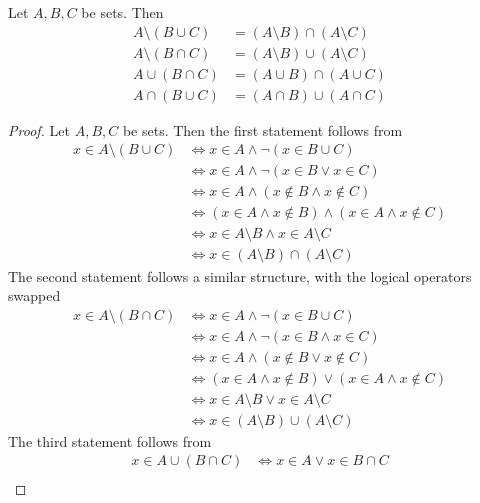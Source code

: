\documentclass[../../script.tex]{subfiles}
\begin{document}
\begin{thm}
	Let $A, B, C$ be sets. Then
	\begin{align*}
		A \setminus (B \cup C) &= (A \setminus B) \cap (A \setminus C) \\
		A \setminus (B \cap C) &= (A \setminus B) \cup (A \setminus C) \\
		A \cup (B \cap C) &= (A \cup B) \cap (A \cup C) \\
		A \cap (B \cup C) &= (A \cap B) \cup (A \cap C)
	\end{align*}
\end{thm}
\begin{proof}
	Let $A, B, C$ be sets. Then the first statement follows from
	\begin{equation}
		\begin{split}
			x \in A \setminus (B \cup C) &\iff x \in A \wedge \neg(x \in B \cup C) \\
			&\iff x \in A \wedge \neg(x \in B \vee x \in C) \\
			&\iff x \in A \wedge (x \not\in B \wedge x \not\in C) \\
			&\iff (x \in A \wedge x \not\in B) \wedge (x \in A \wedge x \not\in C) \\
			&\iff x \in A \setminus B \wedge x \in A \setminus C \\
			&\iff x \in (A \setminus B) \cap (A \setminus C)
		\end{split}
	\end{equation}
	The second statement follows a similar structure, with the logical operators swapped
	\begin{equation}
		\begin{split}
			x \in A \setminus (B \cap C) &\iff x \in A \wedge \neg(x \in B \cup C) \\
			&\iff x \in A \wedge \neg(x \in B \wedge x \in C) \\
			&\iff x \in A \wedge (x \not\in B \vee x \not\in C) \\
			&\iff (x \in A \wedge x \not\in B) \vee (x \in A \wedge x \not\in C) \\
			&\iff x \in A \setminus B \vee x \in A \setminus C \\
			&\iff x \in (A \setminus B) \cup (A \setminus C)
		\end{split}
	\end{equation}
	The third statement follows from 
	\begin{equation}
		\begin{split}
			x \in A \cup (B \cap C) &\iff x \in A \vee x \in B \cap C \\

\end{split}
\end{equation}
\end{proof}
\end{document}
